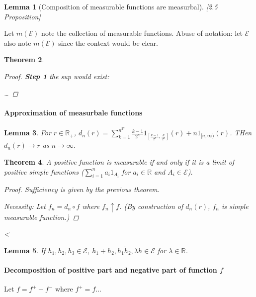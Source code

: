 \documentclass[11pt]{article}
\newcommand{\R}{{\mathbb R}}
\newtheorem{theorem}{Theorem}[subsection]
\newtheorem{lemma}[theorem]{Lemma}
\begin{document}
  \begin{lemma}[Composition of measurable functions are measurbal]
    [2.5 Proposition]
  \end{lemma}

  Let $m(\mathcal E)$ note the collection of measurable functions. Abuse of
  notation: let $\mathcal E$ also note $m(\mathcal E)$ since the context would be
  clear.


  \begin{theorem}

    \label{thm:something}
    \begin{proof}
      \textbf{Step 1} the sup would exist: 

      \dots

    \end{proof}
  \end{theorem}

  \paragraph{Approximation of measurbale functions}
  \begin{lemma}
    For $r\in \R_+$,
    $d_n(r) = \sum _{k=1}^{n^{2^n}} \frac{k-1}{2^n} 1_{[\frac{k-1}{2^n},
    \frac{k}{2^n}]}(r) + n 1_{[n, \infty)}(r)$. THen $d_n(r) \to r$ as
      $n\to\infty$.
      \label{lemma:}
    \end{lemma}

    \begin{theorem}
      A positive function is measurable if and only if it is a limit of positive
      simple functions ($\sum_{i=1}^n a_i 1_{A_i} $ for $ a_i \in \R$ and $A_i \in
      \mathcal E$).
      \begin{proof}
        Sufficiency is given by the previous theorem. 

        Necessity: Let $f_n= d_n \circ f$ where $f_n \uparrow f$. (By construction
        of $d_n(r)$, $f_n$ is simple measurable function.)

      \end{proof}<
    \end{theorem}

    \begin{lemma}
      If $h_1, h_2, h_3 \in \mathcal E$, $h_1 + h_2, h_1 \dot h_2, \lambda h \in
      \mathcal E$ for $\lambda \in \R$.
      \label{Homework_01}
    \end{lemma}

    \paragraph{Decomposition of positive part and negative part of function $f$}
    Let $f = f^+ - f^-$ where $f^+ = f \dots$ 
\end{document}

